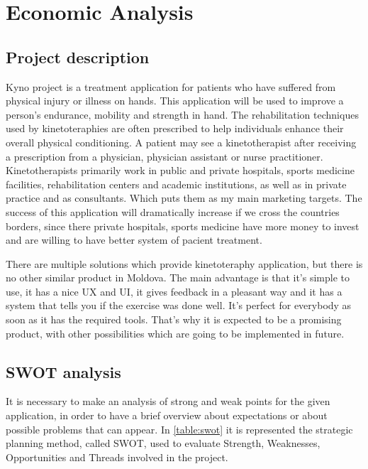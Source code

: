 \section{Economic Analysis}\label{sec:economy}

\subsection{Project description}


Kyno project is a treatment application for patients who have suffered from physical injury or illness on hands. This application will be used to improve a person's endurance, mobility and strength in hand. The rehabilitation techniques used by kinetoteraphies are often prescribed to help individuals enhance their overall physical conditioning. A patient may see a kinetotherapist after receiving a prescription from a physician, physician assistant or nurse practitioner. Kinetotherapists primarily work in public and private hospitals, sports medicine facilities, rehabilitation centers and academic institutions, as well as in private practice and as consultants. Which puts them as my main marketing targets.  The success of this application will dramatically increase if we cross the countries borders, since there private hospitals, sports medicine have more money to invest and are willing to have better system of pacient treatment.

There are multiple solutions which provide kinetoteraphy application, but there is no other
similar product in Moldova. The main advantage is that it’s simple to use, it has a nice UX and UI, it gives feedback in a pleasant way and it has a system that tells you if the exercise was done well. It's perfect for everybody as soon as it has the required tools. That’s why it is expected to be a promising product, with other possibilities which are going to be implemented in future.


\subsection{SWOT analysis}
It is necessary to make an analysis of strong and weak points for the given application, in order to have a
brief overview about expectations or about possible problems that can appear. In \ref{table:swot} it is represented
the strategic planning method, called SWOT, used to evaluate Strength, Weaknesses, Opportunities and
Threads involved in the project.


